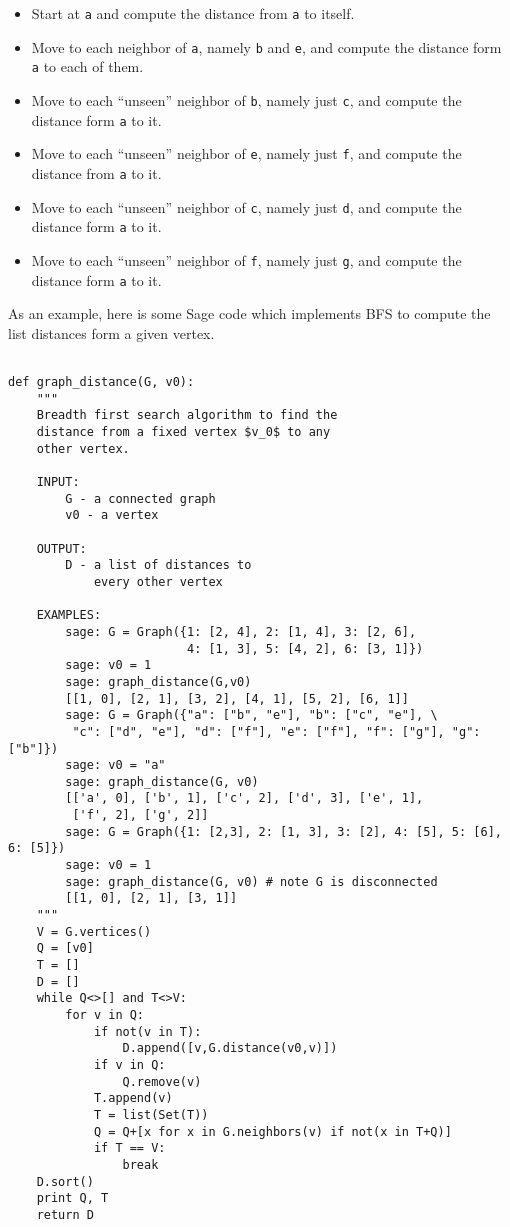 \begin{itemize}
\item
Start at {\tt a} and compute the distance from {\tt a} to itself. 

\item
Move to each neighbor of {\tt a}, namely
{\tt b} and {\tt e}, and compute the distance form {\tt a}
to each of them.

\item
Move to each ``unseen'' neighbor of {\tt b}, namely just
{\tt c}, and compute the distance form {\tt a} to it.

\item
Move to each ``unseen'' neighbor of {\tt e}, namely just
{\tt f}, and compute the distance from {\tt a} to it.

\item
Move to each ``unseen'' neighbor of {\tt c}, namely just
{\tt d}, and compute the distance form {\tt a} to it.

\item
Move to each ``unseen'' neighbor of {\tt f}, namely just
{\tt g}, and compute the distance form {\tt a} to it.

\end{itemize}


As an example, here is some Sage code which implements BFS to
compute the list distances form a given vertex.

\begin{verbatim}

def graph_distance(G, v0):
    """
    Breadth first search algorithm to find the 
    distance from a fixed vertex $v_0$ to any
    other vertex.

    INPUT:
        G - a connected graph
        v0 - a vertex
   
    OUTPUT: 
        D - a list of distances to 
            every other vertex

    EXAMPLES:
        sage: G = Graph({1: [2, 4], 2: [1, 4], 3: [2, 6], 
                         4: [1, 3], 5: [4, 2], 6: [3, 1]})
        sage: v0 = 1
        sage: graph_distance(G,v0)
        [[1, 0], [2, 1], [3, 2], [4, 1], [5, 2], [6, 1]]
        sage: G = Graph({"a": ["b", "e"], "b": ["c", "e"], \
         "c": ["d", "e"], "d": ["f"], "e": ["f"], "f": ["g"], "g":["b"]})
        sage: v0 = "a"            
        sage: graph_distance(G, v0)
        [['a', 0], ['b', 1], ['c', 2], ['d', 3], ['e', 1], 
         ['f', 2], ['g', 2]]
        sage: G = Graph({1: [2,3], 2: [1, 3], 3: [2], 4: [5], 5: [6], 6: [5]})
        sage: v0 = 1
        sage: graph_distance(G, v0) # note G is disconnected
        [[1, 0], [2, 1], [3, 1]]
    """
    V = G.vertices()
    Q = [v0]
    T = []
    D = []
    while Q<>[] and T<>V:
        for v in Q:
            if not(v in T):
                D.append([v,G.distance(v0,v)])
            if v in Q:
                Q.remove(v)
            T.append(v)
            T = list(Set(T)) 
            Q = Q+[x for x in G.neighbors(v) if not(x in T+Q)]
            if T == V:
                break
    D.sort()
    print Q, T
    return D
\end{verbatim}

